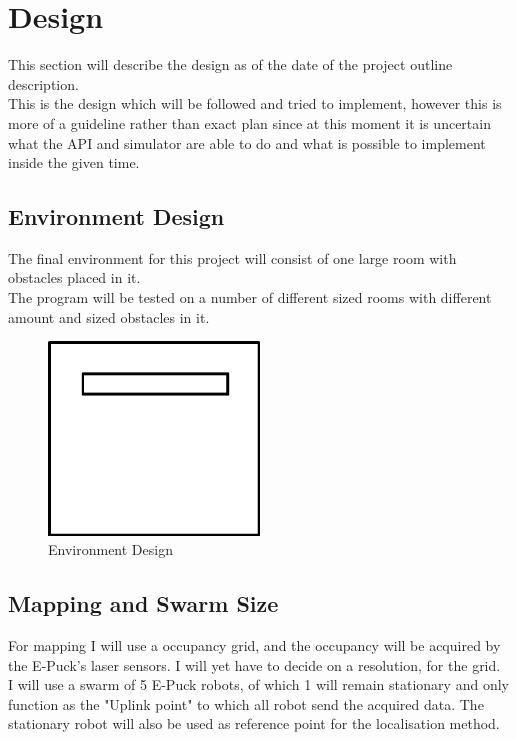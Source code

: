 

\chapter{Design}
\label{Design}

This section will describe the design as of the date of the project outline description. \\
This is the design which will be followed and tried to implement, however this is more of a guideline rather than exact plan since at this moment it is uncertain what the  API and simulator are able to do and what is possible to implement inside the given time.\\

\section{Environment Design}
The final environment for this project will consist of one large room with obstacles placed in it. \\
The program will be tested on a number of different sized rooms with different amount and sized obstacles in it.


\begin{figure}[h]
\centering
\includegraphics[width=0.5\textwidth]{../../figures/environment_example2.png} 
\caption{Environment Design}
\label{Figure 2}
\end{figure}

\section{Mapping and Swarm Size}
For mapping I will use a occupancy grid, and the occupancy will be acquired by the E-Puck's laser sensors. 
I will yet have to decide on a resolution, for the grid.\\
I will use a swarm of 5 E-Puck robots, of which 1 will remain stationary and only function as the "Uplink point" to which all robot send the acquired data. 
The stationary robot will also be used as reference point for the localisation method.

